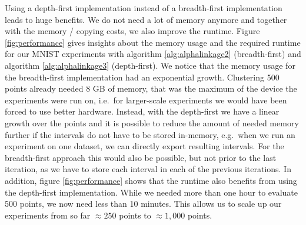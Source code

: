 Using a depth-first implementation instead of a breadth-first implementation leads to huge benefits. We do not need a lot of memory anymore and together with the memory / copying costs, we also improve the runtime. Figure \ref{fig:performance} gives insights about the memory usage and the required runtime for our MNIST experiments with algorithm \ref{alg:alphalinkage2} (breadth-first) and algorithm \ref{alg:alphalinkage3} (depth-first). We notice that the memory usage for the breadth-first implementation had an exponential growth. Clustering 500 points already needed 8 GB of memory, that was the maximum of the device the experiments were run on, i.e.\ for larger-scale experiments we would have been forced to use better hardware. Instead, with the depth-first we have a linear growth over the points and it is possible to reduce the amount of needed memory further if the intervals do not have to be stored in-memory, e.g.\ when we run an experiment on one dataset, we can directly export resulting intervals. For the breadth-first approach this would also be possible, but not prior to the last iteration, as we have to store each interval in each of the previous iterations. In addition, figure \ref{fig:performance} shows that the runtime also benefits from using the depth-first implementation. While we needed more than one hour to evaluate 500 points, we now need less than 10 minutes. This allows us to scale up our experiments from so far $\approx 250$ points to $\approx 1,000$ points.

